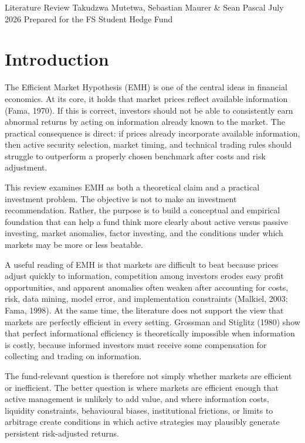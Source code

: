 \documentclass[11pt,a4paper]{article}
\begin{document}
%
{Literature Review}%
{Takudzwa Mutetwa, Sebastian Maurer \& Sean Pascal}%
{July 2026}%
{Prepared for the FS Student Hedge Fund}

\setcounter{tocdepth}{2}
\tableofcontents
\clearpage

\section{Introduction}

The Efficient Market Hypothesis (EMH) is one of the central ideas in financial economics. At its core, it holds that market prices reflect available information (Fama, 1970). If this is correct, investors should not be able to consistently earn abnormal returns by acting on information already known to the market. The practical consequence is direct: if prices already incorporate available information, then active security selection, market timing, and technical trading rules should struggle to outperform a properly chosen benchmark after costs and risk adjustment.

This review examines EMH as both a theoretical claim and a practical investment problem. The objective is not to make an investment recommendation. Rather, the purpose is to build a conceptual and empirical foundation that can help a fund think more clearly about active versus passive investing, market anomalies, factor investing, and the conditions under which markets may be more or less beatable.

A useful reading of EMH is that markets are difficult to beat because prices adjust quickly to information, competition among investors erodes easy profit opportunities, and apparent anomalies often weaken after accounting for costs, risk, data mining, model error, and implementation constraints (Malkiel, 2003; Fama, 1998). At the same time, the literature does not support the view that markets are perfectly efficient in every setting. Grossman and Stiglitz (1980) show that perfect informational efficiency is theoretically impossible when information is costly, because informed investors must receive some compensation for collecting and trading on information.

The fund-relevant question is therefore not simply whether markets are efficient or inefficient. The better question is where markets are efficient enough that active management is unlikely to add value, and where information costs, liquidity constraints, behavioural biases, institutional frictions, or limits to arbitrage create conditions in which active strategies may plausibly generate persistent risk-adjusted returns.
\end{document}
